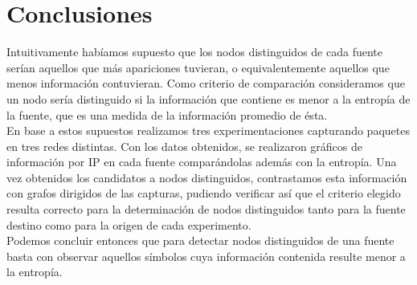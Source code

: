 


\section{Conclusiones}

\indent \indent Intuitivamente habíamos supuesto que los nodos distinguidos de cada fuente serían aquellos que más apariciones tuvieran, o equivalentemente aquellos que menos información contuvieran. Como criterio de comparación consideramos que un nodo sería distinguido si la información que contiene es menor a la entropía de la fuente, que es una medida de la información promedio de ésta.\\
\indent En base a estos supuestos realizamos tres experimentaciones capturando paquetes en tres redes distintas. Con los datos obtenidos, se realizaron gráficos de información por IP en cada fuente comparándolas además con la entropía. Una vez obtenidos los candidatos a nodos distinguidos, contrastamos esta información con grafos dirigidos de las capturas, pudiendo verificar así que el criterio elegido resulta correcto para la determinación de nodos distinguidos tanto para la fuente destino como para la origen de cada experimento.\\
\indent Podemos concluir entonces que para detectar nodos distinguidos de una fuente basta con observar aquellos símbolos cuya información contenida resulte menor a la entropía.\\ 
